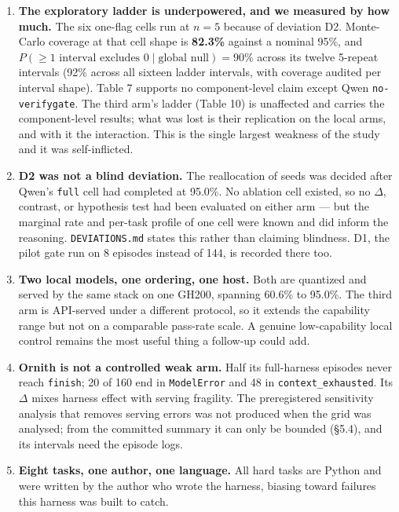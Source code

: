 \documentclass[
  10pt,
  a4paper,
]{article}
\providecommand{\tightlist}{%
  \setlength{\itemsep}{0pt}\setlength{\parskip}{0pt}}
\let\oldtexttt\texttt
\renewcommand{\texttt}[1]{{\small\oldtexttt{#1}}}
\begin{document}
\begin{enumerate}
\def\labelenumi{\arabic{enumi}.}
\tightlist
\item
  \textbf{The exploratory ladder is underpowered, and we measured by how
  much.} The six one-flag cells run at \(n=5\) because of deviation D2.
  Monte-Carlo coverage at that cell shape is \textbf{82.3\%} against a
  nominal 95\%, and
  \(P(\geq 1 \text{ interval excludes } 0 \mid \text{global null}) = 90\%\)
  across its twelve 5-repeat intervals (92\% across all sixteen ladder
  intervals, with coverage audited per interval shape). Table 7 supports
  no component-level claim except Qwen \texttt{no-verifygate}. The third
  arm's ladder (Table 10) is unaffected and carries the component-level
  results; what was lost is their replication on the local arms, and
  with it the interaction. This is the single largest weakness of the
  study and it was self-inflicted.
\item
  \textbf{D2 was not a blind deviation.} The reallocation of seeds was
  decided after Qwen's \texttt{full} cell had completed at 95.0\%. No
  ablation cell existed, so no \(\Delta\), contrast, or hypothesis test
  had been evaluated on either arm --- but the marginal rate and
  per-task profile of one cell were known and did inform the reasoning.
  \texttt{DEVIATIONS.md} states this rather than claiming blindness. D1,
  the pilot gate run on 8 episodes instead of 144, is recorded there
  too.
\item
  \textbf{Two local models, one ordering, one host.} Both are quantized
  and served by the same stack on one GH200, spanning 60.6\% to 95.0\%.
  The third arm is API-served under a different protocol, so it extends
  the capability range but not on a comparable pass-rate scale. A
  genuine low-capability local control remains the most useful thing a
  follow-up could add.
\item
  \textbf{Ornith is not a controlled weak arm.} Half its full-harness
  episodes never reach \texttt{finish}; 20 of 160 end in
  \texttt{ModelError} and 48 in \texttt{context\_exhausted}. Its
  \(\Delta\) mixes harness effect with serving fragility. The
  preregistered sensitivity analysis that removes serving errors was not
  produced when the grid was analysed; from the committed summary it can
  only be bounded (§5.4), and its intervals need the episode logs.
\item
  \textbf{Eight tasks, one author, one language.} All hard tasks are
  Python and were written by the author who wrote the harness, biasing
  toward failures this harness was built to catch.

\end{enumerate}
\end{document}
